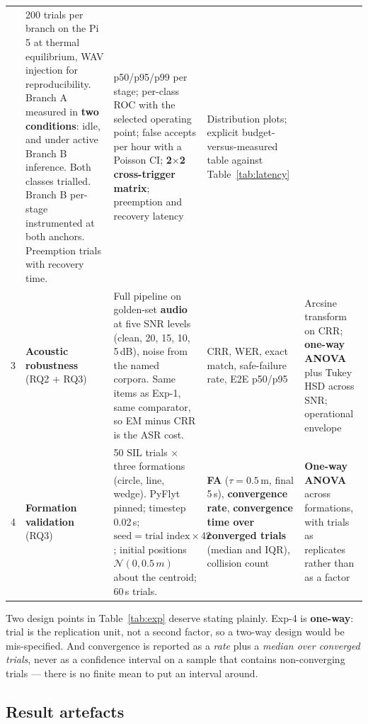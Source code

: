 \documentclass[11pt,a4paper]{article}
\newcommand{\code}[1]{{\ttfamily\small #1}}
\newcommand{\munit}[1]{\,#1}
\begin{document}
\begin{longtable}{@{}P{0.03}P{0.13}P{0.34}P{0.19}P{0.20}@{}}
  & \footnotesize 200 trials per branch on the Pi 5 at thermal equilibrium, WAV injection for
    reproducibility. Branch A measured in \textbf{two conditions}: idle, and under active Branch B
    inference. Both classes trialled. Branch B per-stage instrumented at both anchors. Preemption trials
    with recovery time.
  & \footnotesize p50/p95/p99 per stage; per-class ROC with the selected operating point; false accepts
    per hour with a Poisson CI; \textbf{2$\times$2 cross-trigger matrix}; preemption and recovery latency
  & \footnotesize Distribution plots; explicit budget-versus-measured table against
    Table~\ref{tab:latency} \\
\footnotesize 3 & \footnotesize \textbf{Acoustic robustness} (RQ2 + RQ3)
  & \footnotesize Full pipeline on golden-set \textbf{audio} at five SNR levels (clean, 20, 15, 10,
    5\munit{dB}), noise from the named corpora. Same items as Exp-1, same comparator, so EM minus CRR is
    the ASR cost.
  & \footnotesize CRR, WER, exact match, safe-failure rate, E2E p50/p95
  & \footnotesize Arcsine transform on CRR; \textbf{one-way ANOVA} plus Tukey HSD across SNR; operational
    envelope \\
\footnotesize 4 & \footnotesize \textbf{Formation validation} (RQ3)
  & \footnotesize 50 SIL trials $\times$ three formations (circle, line, wedge). PyFlyt pinned; timestep
    0.02\munit{s}; $\text{seed} = \text{trial index} \times 42$; initial positions
    $\mathcal{N}(0, 0.5\munit{m})$ about the centroid; 60\munit{s} trials.
  & \footnotesize \textbf{FA} ($\tau = 0.5$\munit{m}, final 5\munit{s}), \textbf{convergence rate},
    \textbf{convergence time over converged trials} (median and IQR), collision count
  & \footnotesize \textbf{One-way ANOVA} across formations, with trials as replicates rather than as a
    factor \\
\end{longtable}

Two design points in Table~\ref{tab:exp} deserve stating plainly. Exp-4 is \textbf{one-way}: \code{trial}
is the replication unit, not a second factor, so a two-way design would be mis-specified. And convergence
is reported as a \emph{rate} plus a \emph{median over converged trials}, never as a confidence interval on
a sample that contains non-converging trials --- there is no finite mean to put an interval around.

\subsection{Result artefacts}
\end{document}

